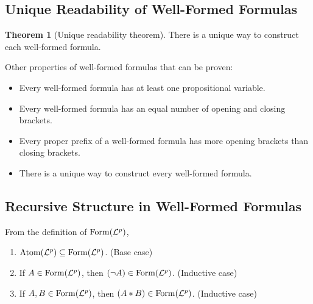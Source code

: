 \documentclass[11pt]{article}
\theoremstyle{definition}
\newtheorem{thm}{Theorem}[section]
\begin{document}
\subsection{Unique Readability of Well-Formed Formulas}

\begin{thm}[Unique readability theorem]
There is a unique way to construct each well-formed formula.
\end{thm}

Other properties of well-formed formulas that can be proven: \vspace{-0.25cm}
\begin{itemize}
    \item Every well-formed formula has at least one propositional variable. 
    \item Every well-formed formula has an equal number of opening and closing brackets.
    \item Every proper prefix of a well-formed formula has more opening brackets than closing brackets. 
    \item There is a unique way to construct every well-formed formula.
\end{itemize}

\subsection{Recursive Structure in Well-Formed Formulas}
From the definition of ${\rm Form}(\mathcal{L}^p)$, \vspace{-0.25cm}
\begin{enumerate}
    \item ${\rm Atom}(\mathcal{L}^p) \subseteq {\rm Form}(\mathcal{L}^p)$. (Base case)
    \item If $A \in {\rm Form}(\mathcal{L}^p)$, then $(\neg A) \in {\rm Form}(\mathcal{L}^p)$. (Inductive case)
    \item If $A, B \in {\rm Form}(\mathcal{L}^p)$, then $(A * B) \in {\rm Form}(\mathcal{L}^p)$. (Inductive case)
\end{enumerate}
\end{document}
